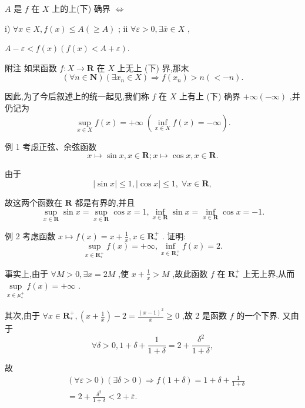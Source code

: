 $A$ 是 $f$ 在 $X$ 上的上(下) 确界 $\Leftrightarrow$

i) $\forall x \in  X,f\left( x\right)  \leq  A\left( { \geq  A}\right)$ ; ii $\forall \varepsilon  > 0,\exists \bar{x} \in  X$ ,

$A - \varepsilon  < f\left( x\right) \left( {f\left( x\right)  < A + \varepsilon }\right) .$

附注 如果函数 $f : X \rightarrow  \mathbf{R}$ 在 $X$ 上无上 (下) 界,那末
$$\left( {\forall n \in  \mathbf{N}}\right) \left( {\exists {x}_{n} \in  X}\right)  \Rightarrow  f\left( {x}_{n}\right)  > n\left( { <  - n}\right) .$$

因此,为了今后叙述上的统一起见,我们称 $f$ 在 $X$ 上有上 (下) 确界 $+ \infty \left( {-\infty }\right)$ ,并仍记为
$$\mathop{\sup }\limits_{{x \in  X}}f\left( x\right)  =  + \infty \;\left( {\mathop{\inf }\limits_{{x \in  X}}f\left( x\right)  =  - \infty }\right) .$$

例 1 考虑正弦、余弦函数
$$x \mapsto  \sin x,x \in  \mathbf{R};x \mapsto  \cos x,x \in  \mathbf{R}.$$

由于
$$\left| {\sin x}\right|  \leq  1,\left| {\cos x}\right|  \leq  1,\;\forall x \in  \mathbf{R},$$

故这两个函数在 $\mathbf{R}$ 都是有界的,并且
$$\mathop{\sup }\limits_{{x \in  \mathbf{R}}}\sin x = \mathop{\sup }\limits_{{x \in  \mathbf{R}}}\cos x = 1,\mathop{\inf }\limits_{{x \in  \mathbf{R}}}\sin x = \mathop{\inf }\limits_{{x \in  \mathbf{R}}}\cos x =  - 1.$$

例 2 考虑函数 $x \mapsto  f\left( x\right)  = x + \frac{1}{x},x \in  {\mathbf{R}}_{ * }^{ + }$ . 证明:
$$\mathop{\sup }\limits_{{x \in  {\mathbf{R}}_{ * }^{ + }}}f\left( x\right)  =  + \infty ,\mathop{\inf }\limits_{{x \in  {\mathbf{R}}_{ * }^{ + }}}f\left( x\right)  = 2.$$

事实上,由于 $\forall M > 0,\exists x = {2M}$ ,使 $x + \frac{1}{x} > M$ ,故此函数 $f$ 在 ${\mathbf{R}}_{ * }^{ + }$ 上无上界,从而 $\mathop{\sup }\limits_{{x \in  {\mu }_{ * }^{ + }}}f\left( x\right)  =  + \infty$ .

其次,由于 $\forall x \in  {\mathbf{R}}_{ * }^{ + },\left( {x + \frac{1}{x}}\right)  - 2 = \frac{{\left( x - 1\right) }^{2}}{x} \geq  0$ ,故 2 是函数 $f$ 的一个下界. 又由于
$$\forall \delta  > 0,1 + \delta  + \frac{1}{1 + \delta } = 2 + \frac{{\delta }^{2}}{1 + \delta },$$

故
\begin{align*}
	&\left( {\forall \varepsilon  > 0}\right) \left( {\exists \delta  > 0}\right)  \Rightarrow  f\left( {1 + \delta }\right)  = 1 + \delta  + \frac{1}{1 + \delta }\\
	&= 2 + \frac{{\delta }^{2}}{1 + \delta } < 2 + \bar{\varepsilon }.
\end{align*}

